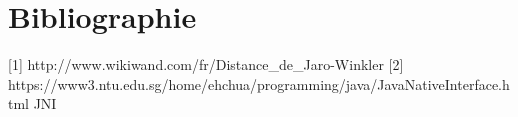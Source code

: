 \chapter*{Bibliographie}

[1] http://www.wikiwand.com/fr/Distance_de_Jaro-Winkler
[2] https://www3.ntu.edu.sg/home/ehchua/programming/java/JavaNativeInterface.html JNI